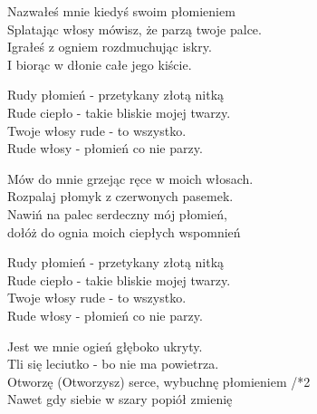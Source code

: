\begin{text}
    Nazwałeś mnie kiedyś swoim płomieniem\\
    Splatając włosy mówisz, że parzą twoje palce.\\
    Igrałeś z ogniem rozdmuchując iskry.\\
    I biorąc w dłonie całe jego kiście.

    Rudy płomień - przetykany złotą nitką\\
    Rude ciepło - takie bliskie mojej twarzy.\\
    Twoje włosy rude - to wszystko.\\
    Rude włosy - płomień co nie parzy.

    Mów do mnie grzejąc ręce w moich włosach.\\
    Rozpalaj płomyk z czerwonych pasemek.\\
    Nawiń na palec serdeczny mój płomień,\\
    dołóż do ognia moich ciepłych wspomnień

    Rudy płomień - przetykany złotą nitką\\
    Rude ciepło - takie bliskie mojej twarzy.\\
    Twoje włosy rude - to wszystko.\\
    Rude włosy - płomień co nie parzy.

    Jest we mnie ogień głęboko ukryty.\\
    Tli się leciutko - bo nie ma powietrza.\\
    Otworzę (Otworzysz) serce, wybuchnę płomieniem /*2\\
    Nawet gdy siebie w szary popiół zmienię
\end{text}
\begin{chord}

\end{chord}